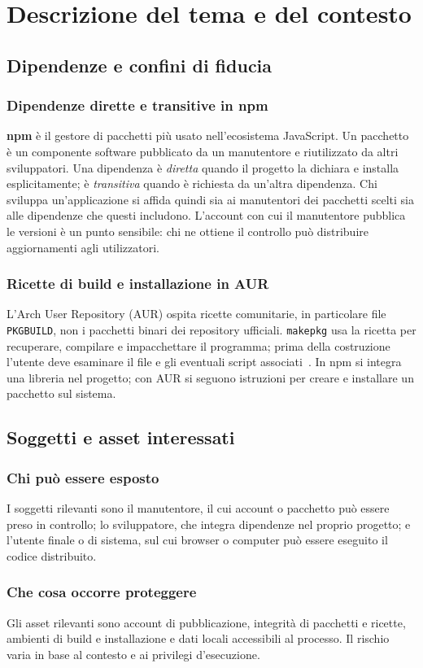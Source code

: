 \section{Descrizione del tema e del contesto}
\label{sec:contesto}

\subsection{Dipendenze e confini di fiducia}
\subsubsection{Dipendenze dirette e transitive in npm}

\textbf{npm} è il gestore di pacchetti più usato nell'ecosistema JavaScript.
Un pacchetto è un componente software pubblicato da un manutentore e riutilizzato
da altri sviluppatori. Una dipendenza è \emph{diretta} quando il progetto la
dichiara e installa esplicitamente; è \emph{transitiva} quando è richiesta da
un'altra dipendenza. Chi sviluppa un'applicazione si affida quindi sia ai
manutentori dei pacchetti scelti sia alle dipendenze che questi includono.
L'account con cui il manutentore pubblica le versioni è un punto sensibile:
chi ne ottiene il controllo può distribuire aggiornamenti agli utilizzatori.

\subsubsection{Ricette di build e installazione in AUR}
L'Arch User Repository (AUR) ospita ricette comunitarie, in particolare file
\texttt{PKGBUILD}, non i pacchetti binari dei repository ufficiali.
\texttt{makepkg} usa la ricetta per recuperare, compilare e impacchettare il
programma; prima della costruzione l'utente deve esaminare il file e gli
eventuali script associati~\cite{archwiki-aur,archwiki-makepkg}. In npm si
integra una libreria nel progetto; con AUR si seguono istruzioni per creare e
installare un pacchetto sul sistema.

\subsection{Soggetti e asset interessati}
\subsubsection{Chi può essere esposto}

I soggetti rilevanti sono il manutentore, il cui account o pacchetto può essere
preso in controllo; lo sviluppatore, che integra dipendenze nel proprio
progetto; e l'utente finale o di sistema, sul cui browser o computer può essere
eseguito il codice distribuito.

\subsubsection{Che cosa occorre proteggere}
Gli asset rilevanti sono account di pubblicazione, integrità di pacchetti e
ricette, ambienti di build e installazione e dati locali accessibili al
processo. Il rischio varia in base al contesto e ai privilegi d'esecuzione.
